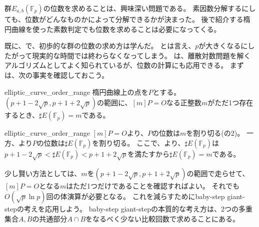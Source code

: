群$E_{a,b}(\mathbb{F}_p)$の位数を求めることは、興味深い問題である。
素因数分解するにしても、位数がどんなものかによって分解できるかが決まった。
後で紹介する楕円曲線を使った素数判定でも位数を求めることは必要になってくる。

既に、で、初歩的な群の位数の求め方は学んだ。
とは言え、$p$が大きくなるにしたがって現実的な時間では終わらなくなってしまう。
は、離散対数問題を解くアルゴリズムとしてよく知られているが、位数の計算にも応用できる。
まずは、次の事実を確認しておこう。

\begin{Prop}{}{elliptic_curve_order_range}
楕円曲線上の点を$P$とする。
$(p+1-2\sqrt{p}, p+1+2\sqrt{p})$の範囲に、$[m]P=O$なる正整数$m$がただ1つ存在するとき、$\sharp E(\mathbb{F}_{p})=m$である。
\end{Prop}

\begin{prProof}{elliptic_curve_order_range}
$[m]P=O$より、$P$の位数は$m$を割り切る(の2)。
一方、より$P$の位数は$\sharp E(\mathbb{F}_{p})$を割り切る。
ここで、より、$\sharp E(\mathbb{F}_{p})$は$p+1-2\sqrt{p}<\sharp E(\mathbb{F}_{p})<p+1+2\sqrt{p}$を満たすから$\sharp E(\mathbb{F}_{p})=m$である。
\end{prProof}

少し賢い方法としては、$m$を$(p+1-2\sqrt{p}, p+1+2\sqrt{p})$の範囲で走らせて、$[m]P=O$となる$m$はただ1つだけであることを確認すればよい。
それでも$O(\sqrt{p}\ln{p})$回の体演算が必要となる。
これを減らすためにbaby-step giant-stepの考えを応用しよう。
baby-step giant-stepの本質的な考え方は、2つの多重集合$A,B$の共通部分$A\cap B$をなるべく少ない比較回数で求めることにある。

